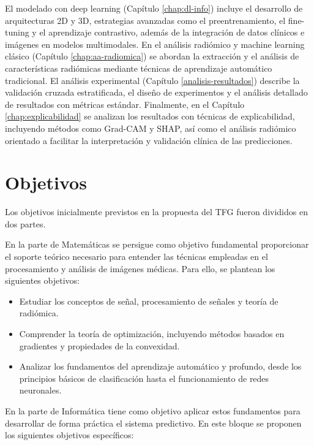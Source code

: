 El modelado con deep learning (Capítulo \ref{chap:dl-info}) incluye el desarrollo de arquitecturas 2D y 3D, estrategias avanzadas como el preentrenamiento, el fine-tuning y el aprendizaje contrastivo, además de la integración de datos clínicos e imágenes en modelos multimodales. En el análisis radiómico y machine learning clásico (Capítulo \ref{chap:aa-radiomica}) se abordan la extracción y el análisis de características radiómicas mediante técnicas de aprendizaje automático tradicional. El análisis experimental (Capítulo \ref{analisis-resultados}) describe la validación cruzada estratificada, el diseño de experimentos y el análisis detallado de resultados con métricas estándar. Finalmente, en el Capítulo \ref{chap:explicabilidad} se analizan los resultados con técnicas de explicabilidad, incluyendo métodos como Grad-CAM y SHAP, así como el análisis radiómico orientado a facilitar la interpretación y validación clínica de las predicciones.


\section{Objetivos}
Los objetivos inicialmente previstos en la propuesta del TFG fueron divididos en dos partes. 

En la parte de Matemáticas se persigue como objetivo fundamental proporcionar el soporte teórico necesario para entender las técnicas empleadas en el procesamiento y análisis de imágenes médicas. Para ello, se plantean los siguientes objetivos:

\begin{itemize}
    \item Estudiar los conceptos de señal, procesamiento de señales y teoría de radiómica.
    \item Comprender la teoría de optimización, incluyendo métodos basados en gradientes y propiedades de la convexidad.
    \item Analizar los fundamentos del aprendizaje automático y profundo, desde los principios básicos de clasificación hasta el funcionamiento de redes neuronales.
\end{itemize}


En la parte de Informática tiene como objetivo aplicar estos fundamentos para desarrollar de forma práctica el sistema predictivo. En este bloque se proponen los siguientes objetivos específicos:

